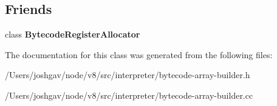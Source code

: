 \subsection*{Friends}
\begin{DoxyCompactItemize}
\item 
class {\bfseries Bytecode\+Register\+Allocator}\hypertarget{classv8_1_1internal_1_1interpreter_1_1_bytecode_array_builder_a6c4ddb408c6a194cb1f6eefea239cd51}{}\label{classv8_1_1internal_1_1interpreter_1_1_bytecode_array_builder_a6c4ddb408c6a194cb1f6eefea239cd51}

\end{DoxyCompactItemize}


The documentation for this class was generated from the following files\+:\begin{DoxyCompactItemize}
\item 
/\+Users/joshgav/node/v8/src/interpreter/bytecode-\/array-\/builder.\+h\item 
/\+Users/joshgav/node/v8/src/interpreter/bytecode-\/array-\/builder.\+cc\end{DoxyCompactItemize}
